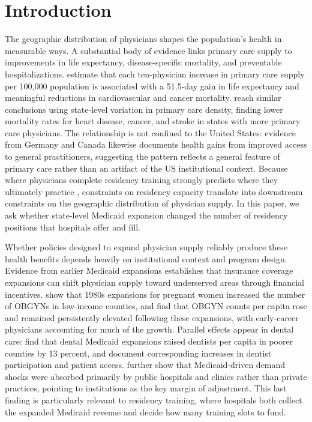 
\section{Introduction}\label{sec:intro}

The geographic distribution of physicians shapes the population's health in measurable ways. A substantial body of evidence links primary care supply to improvements in life expectancy, disease-specific mortality, and preventable hospitalizations. \textcite{basu2019} estimate that each ten-physician increase in primary care supply per 100,000 population is associated with a 51.5-day gain in life expectancy and meaningful reductions in cardiovascular and cancer mortality. \textcite{macinko2007} reach similar conclusions using state-level variation in primary care density, finding lower mortality rates for heart disease, cancer, and stroke in states with more primary care physicians. The relationship is not confined to the United States: evidence from Germany \autocite{sundmacher2011} and Canada \autocite{pierard2014} likewise documents health gains from improved access to general practitioners, suggesting the pattern reflects a general feature of primary care rather than an artifact of the US institutional context. Because where physicians complete residency training strongly predicts where they ultimately practice \autocite{lefevre1983, murphy2020, orr2023}, constraints on residency capacity translate into downstream constraints on the geographic distribution of physician supply. In this paper, we ask whether state-level Medicaid expansion changed the number of residency positions that hospitals offer and fill.

Whether policies designed to expand physician supply reliably produce these health benefits depends heavily on institutional context and program design. Evidence from earlier Medicaid expansions establishes that insurance coverage expansions can shift physician supply toward underserved areas through financial incentives. \textcite{qian2024} show that 1980s expansions for pregnant women increased the number of OBGYNs in low-income counties, and \textcite{huh2024} find that OBGYN counts per capita rose and remained persistently elevated following these expansions, with early-career physicians accounting for much of the growth. Parallel effects appear in dental care: \textcite{huh2021} find that dental Medicaid expansions raised dentists per capita in poorer counties by 13 percent, and \textcite{buchmueller2016} document corresponding increases in dentist participation and patient access. \textcite{baker2000} further show that Medicaid-driven demand shocks were absorbed primarily by public hospitals and clinics rather than private practices, pointing to institutions as the key margin of adjustment. This last finding is particularly relevant to residency training, where hospitals both collect the expanded Medicaid revenue and decide how many training slots to fund.

